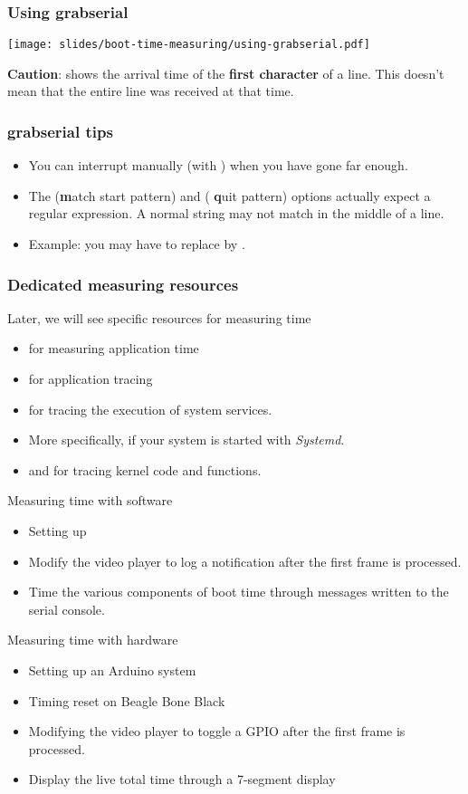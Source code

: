 \begin{frame}
\frametitle{Using grabserial}
\begin{center}
    \texttt{[image: slides/boot-time-measuring/using-grabserial.pdf]}
\end{center}
{\small
{\bf Caution}:  shows the arrival time of the
{\bf first character} of a line. This doesn't mean that the entire line
was received at that time.}
\end{frame}

\begin{frame}
\frametitle{grabserial tips}
\begin{itemize}
  \item You can interrupt  manually (with
  \code{[Ctrl][c]}) when you have gone far enough.
  \item The  ({\bf m}atch start pattern) and  ({\bf
  q}uit pattern) options actually expect a regular expression.
  A normal string may not match in the middle of a line.
  \item Example: you may have to replace  by
  .
\end{itemize}
\end{frame}

\begin{frame}
\frametitle{Dedicated measuring resources}
Later, we will see specific resources for measuring time
\begin{itemize}
  \item {} for measuring application time
  \item {} for application tracing
  \item {} for tracing the execution of system services.
  \item More specifically,  if your system
	is started with {\em Systemd}.
  \item {} and  for
        tracing kernel code and functions.
\end{itemize}
\end{frame}


{
Measuring time with software
\begin{itemize}
\item Setting up 
\item Modify the video player to log a notification
      after the first frame is processed.
\item Time the various components of boot time through messages
      written to the serial console.
\end{itemize}

Measuring time with hardware
\begin{itemize}
\item Setting up an Arduino system
\item Timing reset on Beagle Bone Black
\item Modifying the video player to toggle a GPIO
      after the first frame is processed.
\item Display the live total time through a 7-segment display
\end{itemize}
}
